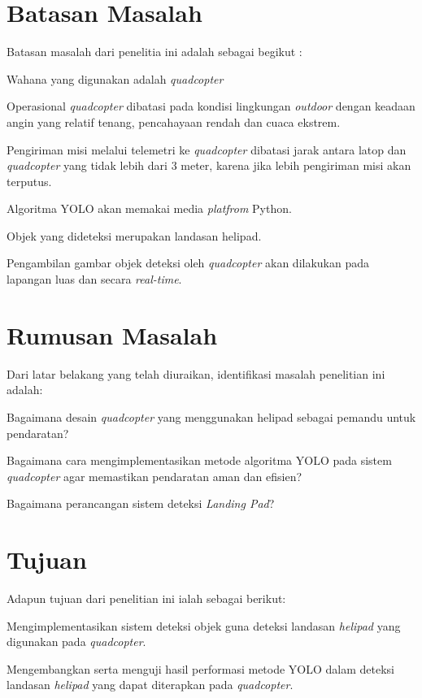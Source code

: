 \section{Batasan Masalah}
Batasan masalah dari penelitia ini adalah sebagai begikut :
\begin{packed_item}
	\item [1.] Wahana yang digunakan adalah \textit{quadcopter}
	\item [2.]Operasional \textit{quadcopter} dibatasi pada kondisi lingkungan \textit{outdoor} dengan keadaan angin yang relatif tenang, pencahayaan rendah dan cuaca ekstrem.
	\item [3.]Pengiriman misi melalui telemetri ke \textit{quadcopter} dibatasi jarak antara latop dan \textit{quadcopter} yang tidak lebih dari 3 meter, karena jika lebih pengiriman misi akan terputus.
	\item [4.]Algoritma YOLO akan memakai media \textit{platfrom} Python.
	\item [5.]Objek yang dideteksi merupakan landasan helipad.
	\item [6.]Pengambilan gambar objek deteksi oleh \textit{quadcopter} akan dilakukan pada lapangan luas dan secara \textit{real-time}.
	
\end{packed_item}

\section{Rumusan Masalah}
Dari latar belakang yang telah diuraikan, identifikasi masalah penelitian ini adalah:

\begin{packed_item}
	\item [1.] Bagaimana desain \textit{quadcopter} yang menggunakan helipad sebagai pemandu untuk pendaratan?
    \item [2.]Bagaimana cara mengimplementasikan metode algoritma YOLO pada sistem \textit{quadcopter} agar memastikan pendaratan aman dan efisien?
    \item [3.]Bagaimana perancangan sistem deteksi \textit{Landing Pad}?
\end{packed_item}

\section{Tujuan}
Adapun tujuan dari penelitian ini ialah sebagai berikut:
\begin{packed_item}
	\item [1.] Mengimplementasikan sistem deteksi objek guna deteksi landasan \textit{helipad} yang digunakan pada \textit{quadcopter}.
	\item [2.]Mengembangkan serta menguji hasil performasi metode YOLO dalam deteksi landasan \textit{helipad} yang dapat diterapkan pada \textit{quadcopter}.
\end{packed_item}

